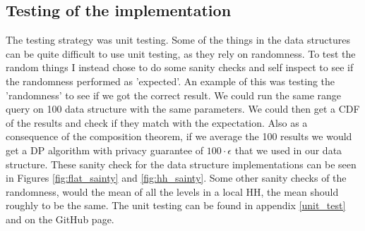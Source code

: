 \documentclass[11pt]{article}
\theoremstyle{definition}
\begin{document}
\subsection{Testing of the implementation}
The testing strategy was unit testing. Some of the things in the data structures can be quite difficult to use unit testing, as they rely on randomness. To test the random things I instead chose to do some sanity checks and self inspect to see if the randomness performed as 'expected'. An example of this was testing the 'randomness' to see if we got the correct result. We could run the same range query on 100 data structure with the same parameters. We could then get a CDF of the results and check if they match with the expectation. Also as a consequence of the composition theorem, if we average the 100 results we would get a DP algorithm with privacy guarantee of $100\cdot\epsilon$ that we used in our data structure. These sanity check for the data structure implementations can be seen in Figures \ref{fig:flat_sainty} and \ref{fig:hh_sainty}. Some other sanity checks of the randomness, would the mean of all the levels in a local HH, the mean should roughly to be the same. The unit testing can be found in appendix \ref{unit_test} and on the GitHub page.
\end{document}
